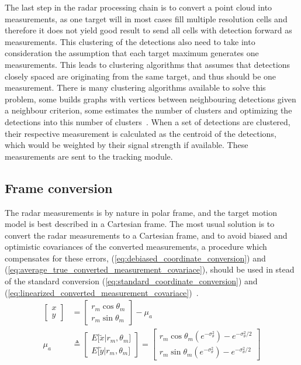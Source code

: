 The last step in the radar processing chain is to convert a point cloud into measurements, as one target will in most cases fill multiple resolution cells and therefore it does not yield good result to send all cells with detection forward as measurements. This clustering of the detections also need to take into consideration the assumption that each target maximum generates one measurements. This leads to clustering algorithms that assumes that detections closely spaced are originating from the same target, and thus should be one measurement. There is many clustering algorithms available to solve this problem, some builds graphs with vertices between neighbouring detections given a neighbour criterion, some estimates the number of clusters and optimizing the detections into this number of clusters~\cite{Mahmuddin2010,Pelleg2000}. When a set of detections are clustered, their respective measurement is calculated as the centroid of the detections, which would be weighted by their signal strength if available. These measurements are sent to the tracking module.

\subsection{Frame conversion}
The radar measurements is by nature in polar frame, and the target motion model is best described in a Cartesian frame. The most usual solution is to convert the radar measurements to a Cartesian frame, and to avoid biased and optimistic covariances of the converted measurements, a procedure which compensates for these errors, (\ref{eq:debiased_coordinate_conversion}) and (\ref{eq:average_true_converted_measurement_covariace}),  should be used in stead of the standard conversion (\ref{eq:standard_coordinate_conversion}) and (\ref{eq:linearized_converted_measurement_covariace})~\cite{Bar-Shalom1995}.
\begin{equation}\label{eq:debiased_coordinate_conversion}
\begin{split}
\begin{bmatrix} x \\ y \end{bmatrix} &= \begin{bmatrix} r_m \cos \theta_m  \\ r_m \sin \theta_m  \end{bmatrix} - \mu_a \\
\mu_a & \triangleq 
\begin{bmatrix}
	E \lbrack \tilde{x}|r_m,\theta_m \rbrack \\ 
	E \lbrack \tilde{y}|r_m,\theta_m \rbrack 
\end{bmatrix} 
= 
\begin{bmatrix}
	r_m \cos \theta_m (e^{-\sigma^2_\theta}) - e^{-\sigma^2_\theta / 2} \\ 
	r_m \sin \theta_m (e^{-\sigma^2_\theta}) - e^{-\sigma^2_\theta / 2}
\end{bmatrix} 
\end{split}
\end{equation}

